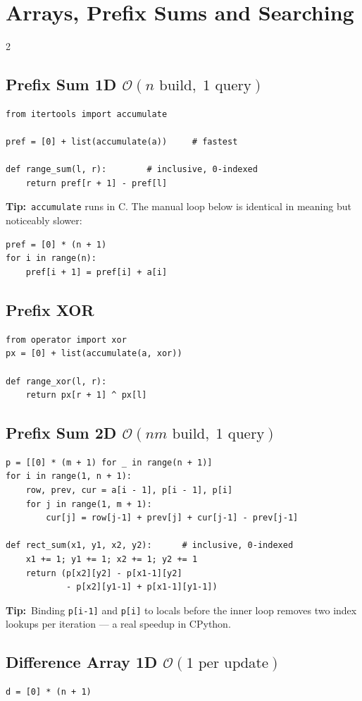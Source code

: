 \documentclass[10pt]{article}
\newcommand{\code}[1]{\texttt{\small #1}}
\newcommand{\sub}[2]{\subsection[#1]{#1\hspace{0.6em}%
  \textnormal{\color{accent2}\small$\mathcal{O}(#2)$}}}
\newcommand{\tip}[1]{{\color{tipc}\footnotesize\textbf{Tip:}}~{\footnotesize #1}\par}
\begin{document}
\section{Arrays, Prefix Sums and Searching}
\begin{multicols}{2}

\sub{Prefix Sum 1D}{n \text{ build},\; 1 \text{ query}}
\begin{lstlisting}
from itertools import accumulate

pref = [0] + list(accumulate(a))     # fastest

def range_sum(l, r):        # inclusive, 0-indexed
    return pref[r + 1] - pref[l]
\end{lstlisting}
\tip{\code{accumulate} runs in C. The manual loop below is identical in
meaning but noticeably slower:}
\begin{lstlisting}
pref = [0] * (n + 1)
for i in range(n):
    pref[i + 1] = pref[i] + a[i]
\end{lstlisting}

\subsection{Prefix XOR}
\begin{lstlisting}
from operator import xor
px = [0] + list(accumulate(a, xor))

def range_xor(l, r):
    return px[r + 1] ^ px[l]
\end{lstlisting}

\sub{Prefix Sum 2D}{nm \text{ build},\; 1 \text{ query}}
\begin{lstlisting}
p = [[0] * (m + 1) for _ in range(n + 1)]
for i in range(1, n + 1):
    row, prev, cur = a[i - 1], p[i - 1], p[i]
    for j in range(1, m + 1):
        cur[j] = row[j-1] + prev[j] + cur[j-1] - prev[j-1]

def rect_sum(x1, y1, x2, y2):      # inclusive, 0-indexed
    x1 += 1; y1 += 1; x2 += 1; y2 += 1
    return (p[x2][y2] - p[x1-1][y2]
            - p[x2][y1-1] + p[x1-1][y1-1])
\end{lstlisting}
\tip{Binding \code{p[i-1]} and \code{p[i]} to locals before the inner
loop removes two index lookups per iteration --- a real speedup in
CPython.}

\sub{Difference Array 1D}{1 \text{ per update}}
\begin{lstlisting}
d = [0] * (n + 1)


\end{lstlisting}
\end{multicols}
\end{document}
